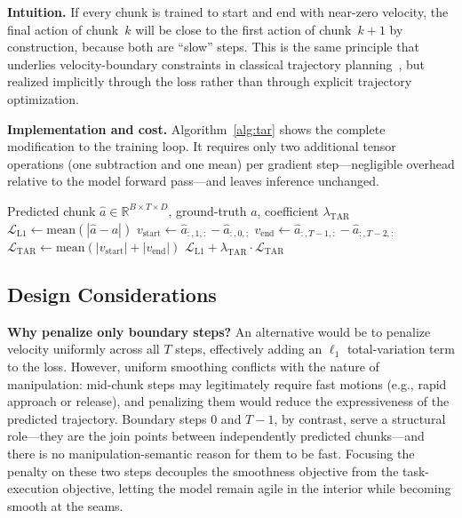 \textbf{Intuition.} If every chunk is trained to start and end with near-zero velocity, the final action of chunk~$k$ will be close to the first action of chunk~$k{+}1$ by construction, because both are ``slow'' steps. This is the same principle that underlies velocity-boundary constraints in classical trajectory planning~\cite{flash1985coordination}, but realized implicitly through the loss rather than through explicit trajectory optimization.

\textbf{Implementation and cost.} Algorithm~\ref{alg:tar} shows the complete modification to the training loop. It requires only two additional tensor operations (one subtraction and one mean) per gradient step---negligible overhead relative to the model forward pass---and leaves inference unchanged.

\begin{algorithm}[t]
\caption{TAR training loss computation}
\label{alg:tar}
\begin{algorithmic}[1]
\Require Predicted chunk $\hat{a} \in \mathbb{R}^{B \times T \times D}$, ground-truth $a$, coefficient $\lambda_{\text{TAR}}$
\State $\mathcal{L}_{\text{L1}} \leftarrow \mathrm{mean}(|\hat{a} - a|)$
\State $v_{\text{start}} \leftarrow \hat{a}_{:,1,:} - \hat{a}_{:,0,:}$ 
\State $v_{\text{end}} \leftarrow \hat{a}_{:,T-1,:} - \hat{a}_{:,T-2,:}$
\State $\mathcal{L}_{\text{TAR}} \leftarrow \mathrm{mean}(|v_{\text{start}}| + |v_{\text{end}}|)$
\State \Return $\mathcal{L}_{\text{L1}} + \lambda_{\text{TAR}} \cdot \mathcal{L}_{\text{TAR}}$
\end{algorithmic}
\end{algorithm}

\subsection{Design Considerations}
\textbf{Why penalize only boundary steps?} An alternative would be to penalize velocity uniformly across all $T$ steps, effectively adding an $\ell_1$ total-variation term to the loss. However, uniform smoothing conflicts with the nature of manipulation: mid-chunk steps may legitimately require fast motions (e.g., rapid approach or release), and penalizing them would reduce the expressiveness of the predicted trajectory. Boundary steps 0 and $T{-}1$, by contrast, serve a structural role---they are the join points between independently predicted chunks---and there is no manipulation-semantic reason for them to be fast. Focusing the penalty on these two steps decouples the smoothness objective from the task-execution objective, letting the model remain agile in the interior while becoming smooth at the seams.

